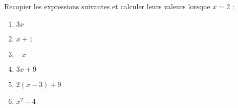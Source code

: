 
\begin{exercice}\label{exosmath-0804}

    Recopier les expressions suivantes et calculer leurs valeurs lorsque \( x=2\) :
    \begin{multicols}{2}
        \begin{enumerate}
            \item
                \( 3x\)
            \item
                \( x+1\)
            \item
                \( -x\)
            \item
                \( 3x+9\)
            \item
                \( 2(x-3)+9\)
            \item
                \( x^2-4\)
        \end{enumerate}
    \end{multicols}

\end{exercice}
